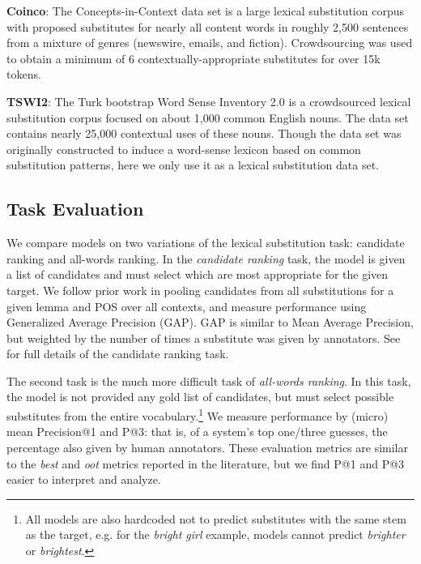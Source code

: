 {\bf Coinco}: The Concepts-in-Context data set \cite{kremer:2014:eacl} is a large
lexical substitution corpus with proposed substitutes for nearly all content
words in roughly 2,500 sentences from a mixture of genres (newswire, emails,
and fiction). Crowdsourcing was used to obtain a minimum of 6
contextually-appropriate substitutes for over 15k tokens.

{\bf TSWI2}: The Turk bootstrap Word Sense Inventory 2.0 \cite{biemann:2012:lrec}
is a crowdsourced lexical substitution corpus focused on about 1,000 common
English nouns. The data set contains nearly 25,000 contextual uses of these
nouns. Though the data set was originally constructed to induce a word-sense
lexicon based on common substitution patterns, here we only use it as a
lexical substitution data set.

\subsection{Task Evaluation}

We compare models on two variations of the lexical substitution task: candidate
ranking and all-words ranking. In the {\em candidate ranking} task, the model is
given a list of candidates and must select which are most appropriate
for the given target. We follow prior work in pooling candidates from all
substitutions for a given lemma and POS over all contexts, and measure
performance using Generalized Average Precision (GAP).  GAP is similar to Mean
Average Precision, but weighted by the number of times a substitute was given
by annotators.  See  for full details of the
candidate ranking task.

The second task is the much more difficult %
task of {\em all-words
ranking}.  In this task, the model is not provided any gold list of candidates,
but must select possible substitutes from the entire vocabulary.\footnote{All models are also hardcoded not to predict substitutes
with the same stem as the target, e.g. for the {\em bright girl} example, models cannot predict {\em brighter} or {\em brightest}.}
We measure performance by (micro) mean Precision@1 and P@3: that is, of a system's top
one/three guesses, the percentage also given by human annotators.  These
evaluation metrics are similar to the {\em best} and {\em oot} metrics
reported in the literature, but we find P@1 and P@3 easier to interpret and
analyze.

